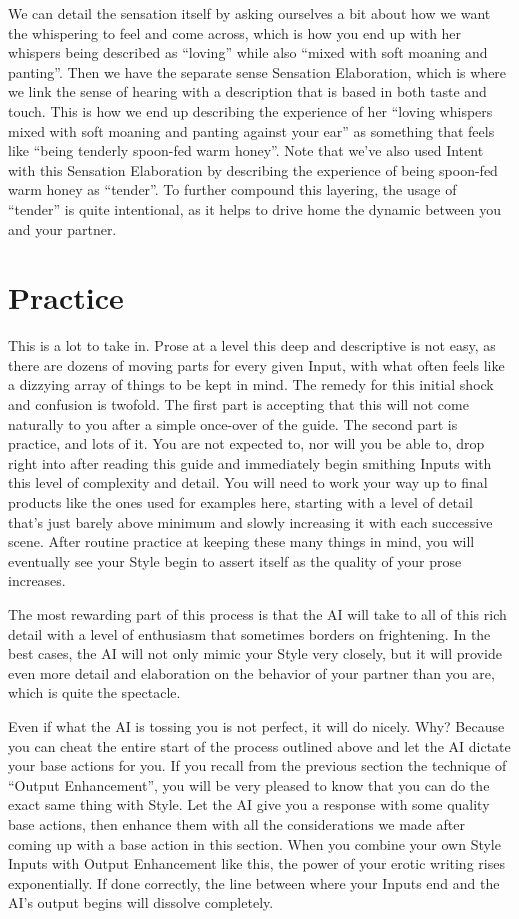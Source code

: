 \documentclass[Source-main.tex]{subfiles}
\begin{document}
We can detail the sensation itself by asking ourselves a bit about how we want the whispering to feel and come across, which is how you end up with her whispers being described as “loving” while also “mixed with soft moaning and panting”.
Then we have the separate sense Sensation Elaboration, which is where we link the sense of hearing with a description that is based in both taste and touch.
This is how we end up describing the experience of her “loving whispers mixed with soft moaning and panting against your ear” as something that feels like “being tenderly spoon-fed warm honey”.
Note that we’ve also used Intent with this Sensation Elaboration by describing the experience of being spoon-fed warm honey as “tender”.
To further compound this layering, the usage of “tender” is quite intentional, as it helps to drive home the dynamic between you and your partner.

\section{Practice}

This is a lot to take in.
Prose at a level this deep and descriptive is not easy, as there are dozens of moving parts for every given Input, with what often feels like a dizzying array of things to be kept in mind.
The remedy for this initial shock and confusion is twofold.
The first part is accepting that this will not come naturally to you after a simple once-over of the guide.
The second part is practice, and lots of it.
You are not expected to, nor will you be able to, drop right into \aid after reading this guide and immediately begin smithing Inputs with this level of complexity and detail.
You will need to work your way up to final products like the ones used for examples here, starting with a level of detail that’s just barely above minimum and slowly increasing it with each successive scene.
After routine practice at keeping these many things in mind, you will eventually see your Style begin to assert itself as the quality of your prose increases.

The most rewarding part of this process is that the AI will take to all of this rich detail with a level of enthusiasm that sometimes borders on frightening.
In the best cases, the AI will not only mimic your Style very closely, but it will provide even more detail and elaboration on the behavior of your partner than you are, which is quite the spectacle.

Even if what the AI is tossing you is not perfect, it will do nicely.
Why?
Because you can cheat the entire start of the process outlined above and let the AI dictate your base actions for you.
If you recall from the previous section the technique of “Output Enhancement”, you will be very pleased to know that you can do the exact same thing with Style.
Let the AI give you a response with some quality base actions, then enhance them with all the considerations we made after coming up with a base action in this section.
When you combine your own Style Inputs with Output Enhancement like this, the power of your erotic writing rises exponentially.
If done correctly, the line between where your Inputs end and the AI’s output begins will dissolve completely.
\end{document}
